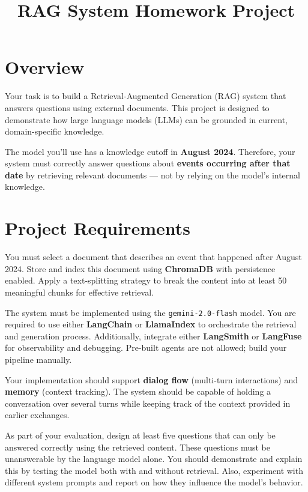 \documentclass[a4paper,12pt]{article}
\title{\textbf{RAG System Homework Project}}
\author{}
\date{}
\begin{document}
\maketitle

\section*{Overview}

Your task is to build a Retrieval-Augmented Generation (RAG) system that answers questions using external documents. This project is designed to demonstrate how large language models (LLMs) can be grounded in current, domain-specific knowledge.

The model you'll use has a knowledge cutoff in \textbf{August 2024}. Therefore, your system must correctly answer questions about \textbf{events occurring after that date} by retrieving relevant documents — not by relying on the model's internal knowledge.

\section*{Project Requirements}

You must select a document that describes an event that happened after August 2024. Store and index this document using \textbf{ChromaDB} with persistence enabled. Apply a text-splitting strategy to break the content into at least 50 meaningful chunks for effective retrieval.

The system must be implemented using the \texttt{gemini-2.0-flash} model. You are required to use either \textbf{LangChain} or \textbf{LlamaIndex} to orchestrate the retrieval and generation process. Additionally, integrate either \textbf{LangSmith} or \textbf{LangFuse} for observability and debugging. Pre-built agents are not allowed; build your pipeline manually.

Your implementation should support \textbf{dialog flow} (multi-turn interactions) and \textbf{memory} (context tracking). The system should be capable of holding a conversation over several turns while keeping track of the context provided in earlier exchanges.

As part of your evaluation, design at least five questions that can only be answered correctly using the retrieved content. These questions must be unanswerable by the language model alone. You should demonstrate and explain this by testing the model both with and without retrieval. Also, experiment with different system prompts and report on how they influence the model’s behavior.
\end{document}
